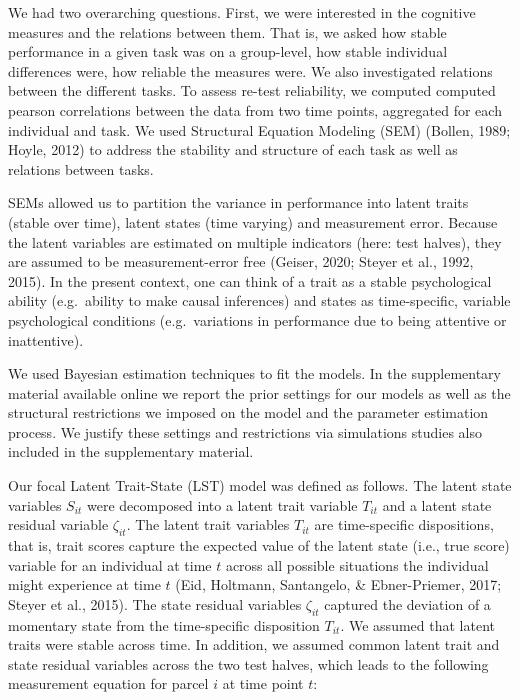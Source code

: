 \documentclass[
  man,floatsintext]{apa6}
\begin{document}
We had two overarching questions. First, we were interested in the cognitive measures and the relations between them. That is, we asked how stable performance in a given task was on a group-level, how stable individual differences were, how reliable the measures were. We also investigated relations between the different tasks. To assess re-test reliability, we computed computed pearson correlations between the data from two time points, aggregated for each individual and task. We used Structural Equation Modeling (SEM) (Bollen, 1989; Hoyle, 2012) to address the stability and structure of each task as well as relations between tasks.

SEMs allowed us to partition the variance in performance into latent traits (stable over time), latent states (time varying) and measurement error. Because the latent variables are estimated on multiple indicators (here: test halves), they are assumed to be measurement-error free (Geiser, 2020; Steyer et al., 1992, 2015). In the present context, one can think of a trait as a stable psychological ability (e.g.~ability to make causal inferences) and states as time-specific, variable psychological conditions (e.g.~variations in performance due to being attentive or inattentive).

We used Bayesian estimation techniques to fit the models. In the supplementary material available online we report the prior settings for our models as well as the structural restrictions we imposed on the model and the parameter estimation process. We justify these settings and restrictions via simulations studies also included in the supplementary material.

Our focal Latent Trait-State (LST) model was defined as follows. The latent state variables \(S_{it}\) were decomposed into a latent trait variable \(T_{it}\) and a latent state residual variable \(\zeta_{it}\). The latent trait variables \(T_{it}\) are time-specific dispositions, that is, trait scores capture the expected value of the latent state (i.e., true score) variable for an individual at time \(t\) across all possible situations the individual might experience at time \(t\) (Eid, Holtmann, Santangelo, \& Ebner-Priemer, 2017; Steyer et al., 2015). The state residual variables \(\zeta_{it}\) captured the deviation of a momentary state from the time-specific disposition \(T_{it}\). We assumed that latent traits were stable across time. In addition, we assumed common latent trait and state residual variables across the two test halves, which leads to the following measurement equation for parcel \(i\) at time point \(t\):
\end{document}
